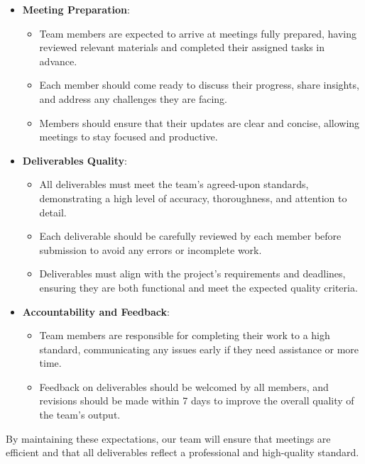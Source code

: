 \documentclass{article}
\begin{document}
\begin{itemize}
    \item \textbf{Meeting Preparation}:
    \begin{itemize}
        \item Team members are expected to arrive at meetings fully prepared, having reviewed relevant materials and completed their assigned tasks in advance.
        \item Each member should come ready to discuss their progress, share insights, and address any challenges they are facing.
        \item Members should ensure that their updates are clear and concise, allowing meetings to stay focused and productive.
    \end{itemize}

    \item \textbf{Deliverables Quality}:
    \begin{itemize}
        \item All deliverables must meet the team’s agreed-upon standards, demonstrating a high level of accuracy, thoroughness, and attention to detail.
        \item Each deliverable should be carefully reviewed by each member before submission to avoid any errors or incomplete work.
        \item Deliverables must align with the project's requirements and deadlines, ensuring they are both functional and meet the expected quality criteria.
    \end{itemize}

    \item \textbf{Accountability and Feedback}:
    \begin{itemize}
        \item Team members are responsible for completing their work to a high standard, communicating any issues early if they need assistance or more time.
        \item Feedback on deliverables should be welcomed by all members, and revisions should be made within 7 days to improve the overall quality of the team’s output.
    \end{itemize}

\end{itemize}

\noindent
By maintaining these expectations, our team will ensure that meetings are efficient and that all deliverables reflect a professional and high-quality standard.
\end{document}
